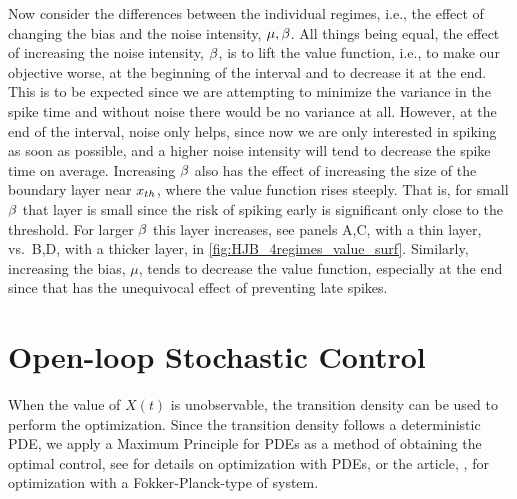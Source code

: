 Now consider the differences between the individual regimes, i.e., the
effect of changing the bias and the noise intensity, ${\mu },\beta$. All things being
equal, the effect of increasing the noise intensity, $\beta$, is to lift the value
function, i.e., to make our objective worse, at the beginning of the interval
and to decrease it at the end. This is to be expected since we are attempting to
minimize the variance in the spike time and without noise there would be no
variance at all. However, at the end of the interval, noise only helps, since
now we are only interested in spiking as soon as possible, and a higher noise
intensity will tend to decrease the spike time on average. Increasing $\beta$ also
has the effect of increasing the size of the boundary layer near ${ x_{th} }$, where
the value function rises steeply. That is, for small $\beta$ that layer is
small since the risk of spiking early is significant only close to the
threshold. For larger $\beta$ this layer increases, see panels A,C, with a thin layer, vs.\ B,D, with a
thicker layer, in \cref{fig:HJB_4regimes_value_surf}. Similarly,
increasing the bias, $\mu$, tends to decrease the value function, especially at
the end since that has the unequivocal effect of preventing late spikes.

\clearpage 
 
\section{Open-loop Stochastic Control}
When the value of $X(t)$ is unobservable, the transition density can be used to
perform the optimization. Since the transition density follows a deterministic
PDE, we apply a Maximum Principle for PDEs as a method of obtaining the optimal
control, see \cite{Borzi2012} for details on optimization with PDEs, or the
article, \cite{Annunziato2010}, for optimization with a
Fokker-Planck-type of system.


